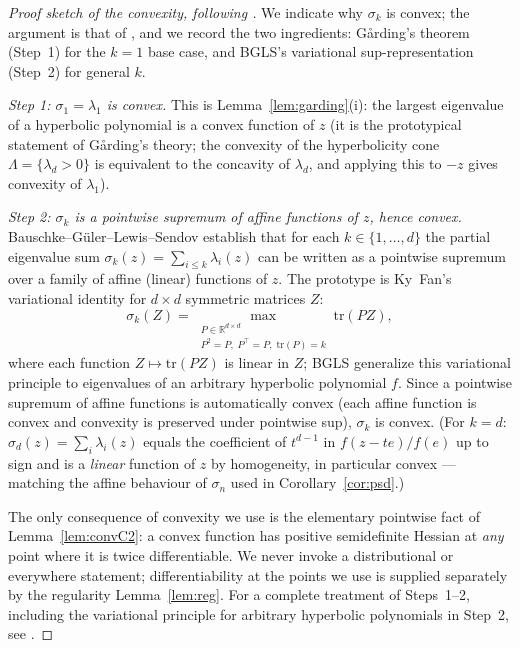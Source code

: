 \begin{proof}[Proof sketch of the convexity, following \cite{BGLS}]
We indicate why $\sigma_k$ is convex; the argument is that of \cite{BGLS}, and we
record the two ingredients: G\aa rding's theorem (Step~1) for the $k=1$ base case,
and BGLS's variational sup-representation (Step~2) for general $k$.

\smallskip\noindent\emph{Step 1: $\sigma_1=\lambda_1$ is convex.} This is
Lemma~\ref{lem:garding}(i): the largest eigenvalue of a hyperbolic polynomial is
a convex function of $z$ (it is the prototypical statement of G\aa rding's
theory; the convexity of the hyperbolicity cone $\Lambda=\{\lambda_d>0\}$ is
equivalent to the concavity of $\lambda_d$, and applying this to $-z$ gives
convexity of $\lambda_1$).

\smallskip\noindent\emph{Step 2: $\sigma_k$ is a pointwise supremum of affine
functions of $z$, hence convex.}
Bauschke--G\"uler--Lewis--Sendov establish \cite[\S4--5]{BGLS} that for each
$k\in\{1,\dots,d\}$ the partial eigenvalue sum $\sigma_k(z)=\sum_{i\le k}\lambda_i(z)$
can be written as a pointwise supremum over a family of affine (linear) functions of
$z$. The prototype is Ky~Fan's variational identity for $d\times d$ symmetric matrices
$Z$:
\[
\sigma_k(Z)=\max_{\substack{P\in\mathbb R^{d\times d}\\P^2=P,\;P^\top=P,\;\mathrm{tr}(P)=k}}
\mathrm{tr}(PZ),
\]
where each function $Z\mapsto\mathrm{tr}(PZ)$ is linear in $Z$; BGLS generalize this
variational principle to eigenvalues of an arbitrary hyperbolic polynomial $f$.
Since a pointwise supremum of affine functions is automatically convex (each affine
function is convex and convexity is preserved under pointwise sup), $\sigma_k$ is
convex.  (For $k=d$: $\sigma_d(z)=\sum_i\lambda_i(z)$ equals the coefficient of
$t^{d-1}$ in $f(z-te)/f(e)$ up to sign and is a \emph{linear} function of $z$ by
homogeneity, in particular convex — matching the affine behaviour of $\sigma_n$ used
in Corollary~\ref{cor:psd}.)

\smallskip
The only consequence of convexity we use is the elementary pointwise fact of
Lemma~\ref{lem:convC2}: a convex function has positive semidefinite Hessian at
\emph{any} point where it is twice differentiable. We never invoke a
distributional or everywhere statement; differentiability at the points we use is
supplied separately by the regularity Lemma~\ref{lem:reg}. For a complete
treatment of Steps~1--2, including the variational principle for arbitrary
hyperbolic polynomials in Step~2, see \cite[Thms.~1--2 and \S4--5]{BGLS}.
\end{proof}

